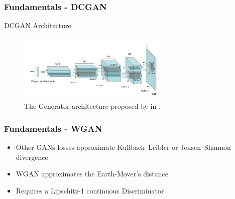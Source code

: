 \begin{frame}
    \frametitle{Fundamentals - DCGAN}

    \begin{center}
        DCGAN Architecture
        
        \begin{figure}[H]
            \centering
            \includegraphics[width=0.65\textwidth]{resources/images/dcgan_generator.png}
            \caption{The Generator architecture proposed by \citeauthor{radford2016dcgan} in  \cite{radford2016dcgan}.}
            \label{fig:dcgan_generator}
        \end{figure}
    \end{center}
\end{frame}


\begin{frame}
    \frametitle{Fundamentals - WGAN}

    \begin{center}
        \begin{itemize}
            \item Other GANs losses approximate Kullback–Leibler or Jensen–Shannon divergence
            \item WGAN approximates the Earth-Mover's distance
            \item Requires a Lipschitz-1 continuous Discriminator
        \end{itemize}
    \end{center}
\end{frame}


